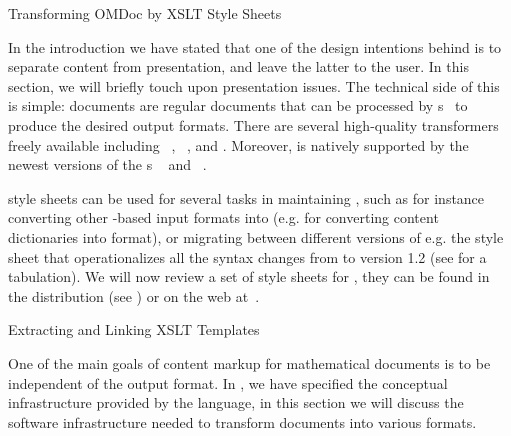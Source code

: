 
\begin{tchapter}[id=transform-xsl,short=Transforming OMDoc]{Transforming OMDoc by XSLT Style Sheets}

In the introduction we have stated that one of the design intentions behind
{\omdoc} is to separate content from presentation, and leave the latter to the
user. In this section, we will briefly touch upon presentation issues. The
technical side of this is simple: {\omdoc} documents are regular {\xml} documents
that can be processed by {\xslt} {s}~\cite{Clark:xslt99} to
produce the desired output formats. There are several high-quality {\xslt}
transformers freely available including {}~\cite{saxon_web},
{}~\cite{xalan_web}, and {}\cite{xsltproc_web}.
Moreover, {\xslt} is natively supported by the newest versions of the
{}s {\msie}~\cite{ie_web} and
{\mozilla}~\cite{mozilla_web}.

{\xslt} style sheets can be used for several tasks in maintaining {\omdoc}, such as for
instance converting other {\xml}-based input formats into {\omdoc} (e.g.
{} for converting {\openmath} content dictionaries into {\omdoc} format), or migrating between different versions of {\omdoc}
e.g. the style sheet {} that operationalizes all the
syntax changes from {} to version 1.2 (see {} for a
tabulation).  We will now review a set of {\xslt} style sheets for {\omdoc}, they can be
found in the {\omdoc} distribution (see {}) or on the web
at~\cite{OMDocXSL:URL}.

\begin{tsection}[id=extract-link-xslt]{Extracting and Linking XSLT Templates}

One of the main goals of content markup for mathematical documents is to be
independent of the output format. In {}, we have specified the
conceptual infrastructure provided by the {\omdoc} language, in this section we
will discuss the software infrastructure needed to transform {\omdoc} documents
into various formats.


\end{tsection}
\end{tchapter}
